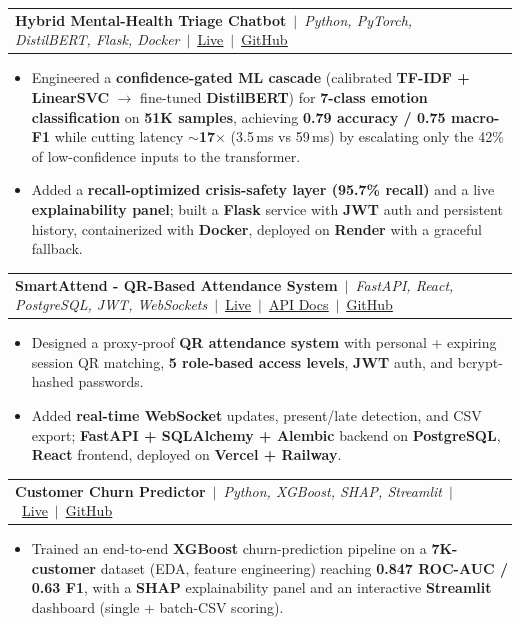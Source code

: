 \documentclass[letterpaper,9pt]{article}
\makeatletter
\newcommand{\resumeItem}[1]{%
  \item\scriptsize{#1}%
}
\newcommand{\resumeProjectHeading}[1]{%
  \vspace{0pt}\item
  \begin{tabular*}{1.0\textwidth}{l@{\extracolsep{\fill}}r}
    \scriptsize #1\\
  \end{tabular*}\vspace{-3pt}%
}
\newcommand{\resumeItemListStart}{\begin{itemize}[leftmargin=0.15in,itemsep=1pt,topsep=1pt,parsep=0pt]}
\newcommand{\resumeItemListEnd}{\end{itemize}\vspace{0pt}}
\makeatother
\begin{document}
  \resumeProjectHeading
    {\textbf{Hybrid Mental-Health Triage Chatbot}~$|$~\emph{Python, PyTorch, DistilBERT, Flask, Docker}~$|$~\href{https://hybrid-chatbot-o0s2.onrender.com}{\underline{Live}}~$|$~\href{https://github.com/afrin2315/hybrid_chatbot}{\underline{GitHub}}}
  \resumeItemListStart
    \resumeItem{Engineered a \textbf{confidence-gated ML cascade} (calibrated \textbf{TF-IDF + LinearSVC} $\rightarrow$ fine-tuned \textbf{DistilBERT}) for \textbf{7-class emotion classification} on \textbf{51K samples}, achieving \textbf{0.79 accuracy / 0.75 macro-F1} while cutting latency \textbf{$\sim$17$\times$} (3.5\,ms vs 59\,ms) by escalating only the 42\% of low-confidence inputs to the transformer.}
    \resumeItem{Added a \textbf{recall-optimized crisis-safety layer (95.7\% recall)} and a live \textbf{explainability panel}; built a \textbf{Flask} service with \textbf{JWT} auth and persistent history, containerized with \textbf{Docker}, deployed on \textbf{Render} with a graceful fallback.}
  \resumeItemListEnd

  \resumeProjectHeading
    {\textbf{SmartAttend - QR-Based Attendance System}~$|$~\emph{FastAPI, React, PostgreSQL, JWT, WebSockets}~$|$~\href{https://smart-attend-beryl.vercel.app}{\underline{Live}}~$|$~\href{https://smartattend-api-production-9bd4.up.railway.app/docs}{\underline{API Docs}}~$|$~\href{https://github.com/afrin2315/smart_attend}{\underline{GitHub}}}
  \resumeItemListStart
    \resumeItem{Designed a proxy-proof \textbf{QR attendance system} with personal + expiring session QR matching, \textbf{5 role-based access levels}, \textbf{JWT} auth, and bcrypt-hashed passwords.}
    \resumeItem{Added \textbf{real-time WebSocket} updates, present/late detection, and CSV export; \textbf{FastAPI + SQLAlchemy + Alembic} backend on \textbf{PostgreSQL}, \textbf{React} frontend, deployed on \textbf{Vercel + Railway}.}
  \resumeItemListEnd

  \resumeProjectHeading
    {\textbf{Customer Churn Predictor}~$|$~\emph{Python, XGBoost, SHAP, Streamlit}~$|$~\href{https://churn-predictor-afrin.streamlit.app}{\underline{Live}}~$|$~\href{https://github.com/afrin2315/churn_predictor}{\underline{GitHub}}}
  \resumeItemListStart
    \resumeItem{Trained an end-to-end \textbf{XGBoost} churn-prediction pipeline on a \textbf{7K-customer} dataset (EDA, feature engineering) reaching \textbf{0.847 ROC-AUC / 0.63 F1}, with a \textbf{SHAP} explainability panel and an interactive \textbf{Streamlit} dashboard (single + batch-CSV scoring).}
  \resumeItemListEnd
\end{document}
